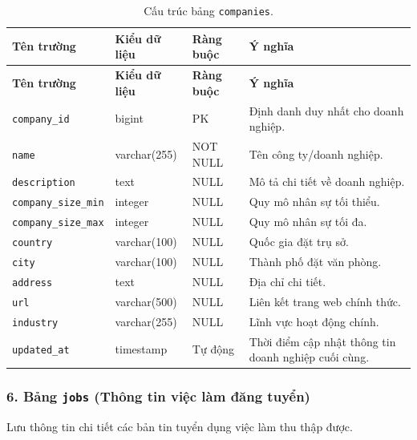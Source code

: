\begin{footnotesize}\begin{longtable}{|L{3.5cm}|L{2.0cm}|L{3.0cm}|L{5.5cm}|}
\caption{Cấu trúc bảng \texttt{companies}.}
\label{tab:companies} \\
\hline
\textbf{Tên trường} & \textbf{Kiểu dữ liệu} & \textbf{Ràng buộc} & \textbf{Ý nghĩa} \\
\hline
\endfirsthead
\hline
\textbf{Tên trường} & \textbf{Kiểu dữ liệu} & \textbf{Ràng buộc} & \textbf{Ý nghĩa} \\
\hline
\endhead
\texttt{company\_id} & bigint & PK & Định danh duy nhất cho doanh nghiệp. \\
\hline
\texttt{name} & varchar(255) & NOT NULL & Tên công ty/doanh nghiệp. \\
\hline
\texttt{description} & text & NULL & Mô tả chi tiết về doanh nghiệp. \\
\hline
\texttt{company\_\allowbreak size\_\allowbreak min} & integer & NULL & Quy mô nhân sự tối thiểu. \\
\hline
\texttt{company\_\allowbreak size\_\allowbreak max} & integer & NULL & Quy mô nhân sự tối đa. \\
\hline
\texttt{country} & varchar(100) & NULL & Quốc gia đặt trụ sở. \\
\hline
\texttt{city} & varchar(100) & NULL & Thành phố đặt văn phòng. \\
\hline
\texttt{address} & text & NULL & Địa chỉ chi tiết. \\
\hline
\texttt{url} & varchar(500) & NULL & Liên kết trang web chính thức. \\
\hline
\texttt{industry} & varchar(255) & NULL & Lĩnh vực hoạt động chính. \\
\hline
\texttt{updated\_at} & timestamp & Tự động & Thời điểm cập nhật thông tin doanh nghiệp cuối cùng. \\
\hline
\end{longtable}
\end{footnotesize}

\subsubsection*{6. Bảng \texttt{jobs} (Thông tin việc làm đăng tuyển)}

Lưu thông tin chi tiết các bản tin tuyển dụng việc làm thu thập được.


